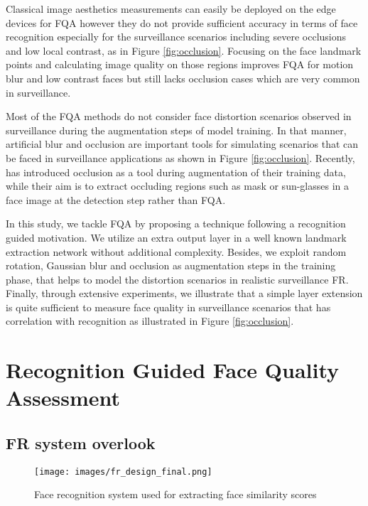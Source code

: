 \documentclass[runningheads]{llncs}
\begin{document}
Classical image aesthetics measurements can easily be deployed on the edge devices for FQA however they do not provide sufficient accuracy in terms of face recognition especially for the surveillance scenarios including severe occlusions and low local contrast, as in Figure \ref{fig:occlusion}. Focusing on the face landmark points and calculating image quality on those regions improves FQA for motion blur and low contrast faces but still lacks occlusion cases which are very common in surveillance.

Most of the FQA methods do not consider face distortion scenarios observed in surveillance during the augmentation steps of model training. In that manner, artificial blur and occlusion are important tools for simulating scenarios that can be faced in surveillance applications as shown in Figure \ref{fig:occlusion}. Recently, \cite{Occ_aware_FD} has introduced occlusion as a tool during augmentation of their training data, while their aim is to extract occluding regions such as mask or sun-glasses in a face image at the detection step rather than FQA.

In this study, we tackle FQA by proposing a technique following a recognition guided motivation. We utilize an extra output layer in a well known landmark extraction network without additional complexity. Besides, we exploit random rotation, Gaussian blur and occlusion as augmentation steps in the training phase, that helps to model the distortion scenarios in realistic surveillance FR. Finally, through extensive experiments, we illustrate that a simple layer extension is quite sufficient to measure face quality in surveillance scenarios that has correlation with recognition as illustrated in Figure \ref{fig:occlusion}.


\section{Recognition Guided Face Quality Assessment}
\subsection{FR system overlook}
\begin{figure}[t]
  \texttt{[image: images/fr\_design\_final.png]}
  \caption{Face recognition system used for extracting face similarity scores} 
  \label{fig:fr_model}
\end{figure}
\end{document}
